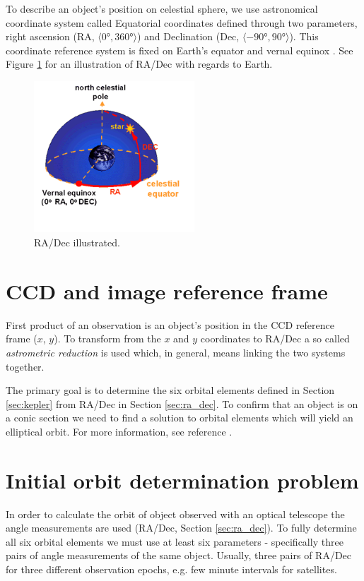 	To describe an object's position on celestial sphere, we use astronomical coordinate system called Equatorial coordinates defined through two parameters, right ascension (RA, $\langle\ang{0},\ang{360}\rangle$) and Declination (Dec, $\langle\ang{-90},\ang{90}\rangle$). This coordinate reference system is fixed on Earth's equator and vernal equinox \citep{montenbruck2005satellite}. See Figure \ref{fig:equatorial} for an illustration of RA/Dec with regards to Earth.
	
	\begin{figure}[H]
	\centering
	  \includegraphics[width=6cm]{images/equatorial}
		  \caption{RA/Dec illustrated.}
	  \label{fig:equatorial}
	\end{figure}

\section{CCD and image reference frame}\label{sec:ccd}

	First product of an observation is an object's position in the CCD reference frame ($x$, $y$). To transform from the $x$ and $y$ coordinates to RA/Dec a so called \emph{astrometric reduction} is used which, in general, means linking the two systems together.
	
	The primary goal is to determine the six orbital elements defined in Section \ref{sec:kepler} from RA/Dec in Section \ref{sec:ra_dec}. To confirm that an object is on a conic section we need to find a solution to orbital elements which will yield an elliptical orbit. For more information, see reference \citep{montenbruck2005satellite}.
	
\section{Initial orbit determination problem}\label{sec:init_orbit_det}
	
	In order to calculate the orbit of object observed with an optical telescope the angle measurements are used (RA/Dec, Section \ref{sec:ra_dec}). To fully determine all six orbital elements we must use at least six parameters - specifically three pairs of angle measurements of the same object. Usually, three pairs of RA/Dec for three different observation epochs, e.g. few minute intervals for satellites. 	
	
